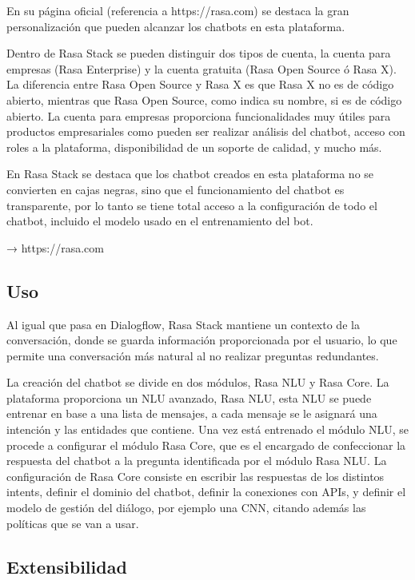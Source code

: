 En su página oficial (referencia a https://rasa.com) se destaca la gran personalización que pueden alcanzar los chatbots en esta plataforma.

Dentro de Rasa Stack se pueden distinguir dos tipos de cuenta, la cuenta para empresas (Rasa Enterprise) y la cuenta gratuita (Rasa Open Source ó Rasa X). La diferencia entre Rasa Open Source y Rasa X es que Rasa X no es de código abierto, mientras que Rasa Open Source, como indica su nombre, si es de código abierto. La cuenta para empresas proporciona funcionalidades muy útiles para productos empresariales como pueden ser realizar análisis del chatbot, acceso con roles a la plataforma, disponibilidad de un soporte de calidad, y mucho más.

En Rasa Stack se destaca que los chatbot creados en esta plataforma no se convierten en cajas negras, sino que el funcionamiento del chatbot es transparente, por lo tanto se tiene total acceso a la configuración de todo el chatbot, incluido el modelo usado en el entrenamiento del bot.


→ https://rasa.com

\subsection*{Uso}

Al igual que pasa en Dialogflow, Rasa Stack mantiene un contexto de la conversación, donde se guarda información proporcionada por el usuario, lo que permite una conversación más natural al no realizar preguntas redundantes.

La creación del chatbot se divide en dos módulos, Rasa NLU y Rasa Core. La plataforma proporciona un NLU avanzado, Rasa NLU, esta NLU se puede entrenar en base a una lista de mensajes, a cada mensaje se le asignará una intención y las entidades que contiene. Una vez está entrenado el módulo NLU, se procede a configurar el módulo Rasa Core, que es el encargado de confeccionar la respuesta del chatbot a la pregunta identificada por el módulo Rasa NLU. La configuración de Rasa Core consiste en escribir las respuestas de los distintos intents, definir el dominio del chatbot, definir la conexiones con APIs, y definir el modelo de gestión del diálogo, por ejemplo una CNN, citando además las políticas que se van a usar.

\subsection*{Extensibilidad}


